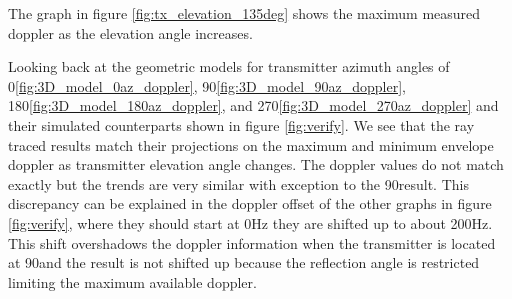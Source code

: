The graph in figure \ref{fig:tx_elevation_135deg} shows the maximum measured doppler as the elevation angle increases. 

Looking back at the geometric models for transmitter azimuth angles of 0\textdegree \space \ref{fig:3D_model_0az_doppler}, 90\textdegree \space \ref{fig:3D_model_90az_doppler}, 180\textdegree \space \ref{fig:3D_model_180az_doppler}, and 270\textdegree \space \ref{fig:3D_model_270az_doppler} and their simulated counterparts shown in figure \ref{fig:verify}. We see that the ray traced results match their projections on the maximum and minimum envelope doppler as transmitter elevation angle changes. The doppler values do not match exactly but the trends are very similar with exception to the 90\textdegree \space result. This discrepancy can be explained in the doppler offset of the other graphs in figure \ref{fig:verify}, where they should start at 0Hz they are shifted up to about 200Hz. This shift overshadows the doppler information when the transmitter is located at 90\textdegree \space and the result is not shifted up because the reflection angle is restricted limiting the maximum available doppler.

